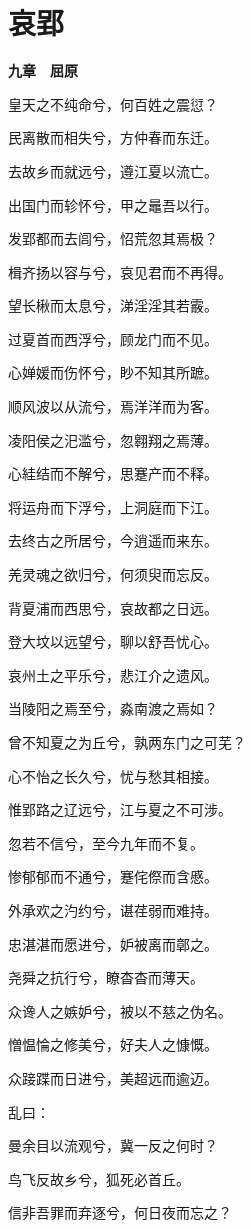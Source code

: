 \documentclass[12pt,a4paper]{ctexbook}
\begin{document}
\section{哀郢}
\textbf{九章　屈原}\par\vspace{0.5em}
皇天之不纯命兮，何百姓之震愆？\par
民离散而相失兮，方仲春而东迁。\par
去故乡而就远兮，遵江夏以流亡。\par
出国门而轸怀兮，甲之鼂吾以行。\par
发郢都而去闾兮，怊荒忽其焉极？\par
楫齐扬以容与兮，哀见君而不再得。\par
望长楸而太息兮，涕淫淫其若霰。\par
过夏首而西浮兮，顾龙门而不见。\par
心婵媛而伤怀兮，眇不知其所蹠。\par
顺风波以从流兮，焉洋洋而为客。\par
凌阳侯之汜滥兮，忽翱翔之焉薄。\par
心絓结而不解兮，思蹇产而不释。\par
将运舟而下浮兮，上洞庭而下江。\par
去终古之所居兮，今逍遥而来东。\par
羌灵魂之欲归兮，何须臾而忘反。\par
背夏浦而西思兮，哀故都之日远。\par
登大坟以远望兮，聊以舒吾忧心。\par
哀州土之平乐兮，悲江介之遗风。\par
当陵阳之焉至兮，淼南渡之焉如？\par
曾不知夏之为丘兮，孰两东门之可芜？\par
心不怡之长久兮，忧与愁其相接。\par
惟郢路之辽远兮，江与夏之不可涉。\par
忽若不信兮，至今九年而不复。\par
惨郁郁而不通兮，蹇侘傺而含慼。\par
外承欢之汋约兮，谌荏弱而难持。\par
忠湛湛而愿进兮，妒被离而鄣之。\par
尧舜之抗行兮，瞭杳杳而薄天。\par
众谗人之嫉妒兮，被以不慈之伪名。\par
憎愠惀之修美兮，好夫人之慷慨。\par
众踥蹀而日进兮，美超远而逾迈。\par
乱曰：\par
曼余目以流观兮，冀一反之何时？\par
鸟飞反故乡兮，狐死必首丘。\par
信非吾罪而弃逐兮，何日夜而忘之？\par
\end{document}
